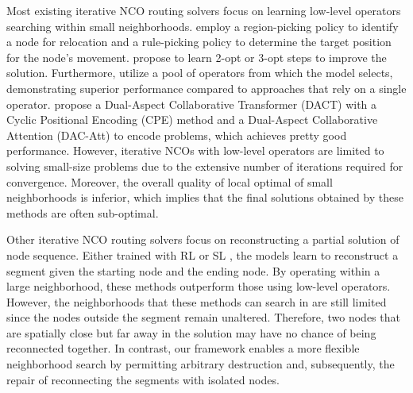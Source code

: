 Most existing iterative NCO routing solvers focus on learning low-level operators searching within small neighborhoods. \citet{chen2019neural_rewriter} employ a region-picking policy to identify a node for relocation and a rule-picking policy to determine the target position for the node's movement. \citet{d2020learning2opt, sui2021learning3opt} propose to learn 2-opt or 3-opt steps to improve the solution. Furthermore, \citet{lu2019learning, wu2021learning} utilize a pool of operators from which the model selects, demonstrating superior performance compared to approaches that rely on a single operator. \citet{ma2021DACT} propose a Dual-Aspect Collaborative Transformer (DACT) with a Cyclic Positional Encoding (CPE) method and a Dual-Aspect Collaborative Attention (DAC-Att) to encode problems, which achieves pretty good performance. However, iterative NCOs with low-level operators are limited to solving small-size problems due to the extensive number of iterations required for convergence. Moreover, the overall quality of local optimal of small neighborhoods is inferior, which implies that the final solutions obtained by these methods are often sub-optimal. 


Other iterative NCO routing solvers focus on reconstructing a partial solution of node sequence. Either trained with RL \cite{LCP, cheng2023select, ye2024glop} or SL \cite{luo2023lehd, luo2024SIL}, the models learn to reconstruct a segment given the starting node and the ending node. By operating within a large neighborhood, these methods outperform those using low-level operators. However, the neighborhoods that these methods can search in are still limited since the nodes outside the segment remain unaltered. Therefore, two nodes that are spatially close but far away in the solution may have no chance of being reconnected together. In contrast, our framework enables a more flexible neighborhood search by permitting arbitrary destruction and, subsequently, the repair of reconnecting the segments with isolated nodes.